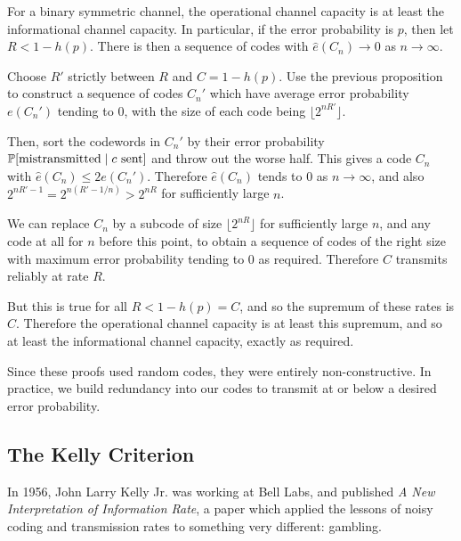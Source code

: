 \documentclass{article}
\begin{document}
\begin{proposition}
    For a binary symmetric channel, the operational channel capacity is at least the informational channel capacity.
    In particular, if the error probability is $p$, then let $R < 1 - h(p)$.
    There is then a sequence of codes with $\hat e(C_n) \to 0$ as $n \to \infty$.
\end{proposition}
\begin{prf}
    Choose $R'$ strictly between $R$ and $C = 1 - h(p)$.
    Use the previous proposition to construct a sequence of codes $C_n'$
    which have average error probability $e(C_n')$ tending to 0,
    with the size of each code being $\lfloor 2^{nR'} \rfloor$.
    
    Then, sort the codewords in $C_n'$ by their error probability
    $\P[\text{mistransmitted} \mid c \text{ sent}]$
    and throw out the worse half.
    This gives a code $C_n$ with $\hat e(C_n) \leq 2e(C_n')$.
    Therefore $\hat e(C_n)$ tends to 0 as $n \to \infty$,
    and also $2^{nR'-1} = 2^{n(R' - 1/n)} > 2^{nR}$ for sufficiently large $n$.
    
    We can replace $C_n$ by a subcode of size $\lfloor 2^{nR} \rfloor$
    for sufficiently large $n$, and any code at all for $n$ before this point,
    to obtain a sequence of codes of the right size
    with maximum error probability tending to 0 as required.
    Therefore $C$ transmits reliably at rate $R$.
    
    But this is true for all $R < 1 - h(p) = C$,
    and so the supremum of these rates is $C$.
    Therefore the operational channel capacity is at least this supremum,
    and so at least the informational channel capacity, exactly as required.
\end{prf}

\begin{note}
	Since these proofs used random codes, they were entirely non-constructive. In practice, we build redundancy into our codes to transmit at or below a desired error probability.
\end{note}


\subsection{The Kelly Criterion}
\label{section-error-control-kelly-criterion}

In 1956, John Larry Kelly Jr. was working at Bell Labs, and published \textit{A New Interpretation of Information Rate}, a paper which applied the lessons of noisy coding and transmission rates to something very different: gambling.
\end{document}
